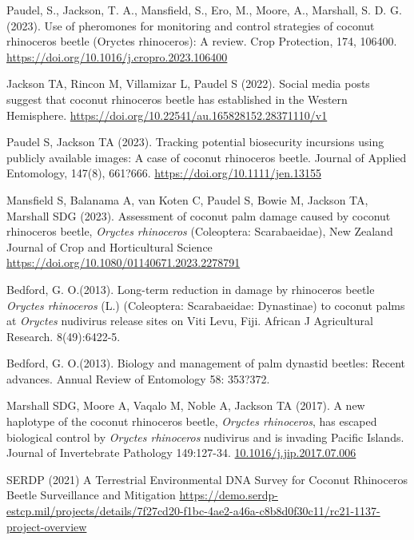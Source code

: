 \documentclass[11pt,english,letterpaper]{scrartcl}
\begin{document}
\begingroup
\renewcommand{\section}[2]{}%
\begin{thebibliography}{1}
	
 Paudel, S., Jackson, T. A., Mansfield, S., Ero, M., Moore, A., Marshall, S. D. G. (2023). Use of pheromones for monitoring and control strategies of coconut rhinoceros beetle (Oryctes rhinoceros): A review. Crop Protection, 174, 106400. \url{https://doi.org/10.1016/j.cropro.2023.106400}
	
 Jackson TA, Rincon M, Villamizar L, Paudel S (2022). Social media posts suggest that coconut rhinoceros beetle has established in the Western Hemisphere. \url{https://doi.org/10.22541/au.165828152.28371110/v1}
	
 Paudel S, Jackson TA (2023). Tracking potential biosecurity incursions using publicly available images: A case of coconut rhinoceros beetle. Journal of Applied Entomology, 147(8), 661?666. 
\url{https://doi.org/10.1111/jen.13155}
	
 Mansfield S, Balanama A, van Koten C, Paudel S, Bowie M, Jackson TA, Marshall SDG (2023). Assessment of coconut palm damage caused by coconut rhinoceros beetle, \textit{Oryctes rhinoceros} (Coleoptera: Scarabaeidae), New Zealand Journal of Crop and Horticultural Science \url{https://doi.org/10.1080/01140671.2023.2278791}
	
 Bedford, G. O.(2013). Long-term reduction in damage by rhinoceros beetle \textit{Oryctes rhinoceros} (L.) (Coleoptera: Scarabaeidae: Dynastinae) to coconut palms at \textit{Oryctes} nudivirus release sites on Viti Levu, Fiji. African J Agricultural Research. 8(49):6422-5. 

 Bedford, G. O.(2013). Biology and management of palm dynastid beetles: Recent advances. Annual Review of Entomology 58: 353?372. 

 Marshall SDG, Moore A, Vaqalo M, Noble A, Jackson TA (2017). A new haplotype of the coconut rhinoceros beetle, \textit{Oryctes rhinoceros}, has escaped biological control by \textit{Oryctes rhinoceros} nudivirus and is invading Pacific Islands. Journal of Invertebrate Pathology 149:127-34. 
\url{10.1016/j.jip.2017.07.006}

 SERDP (2021) A Terrestrial Environmental DNA Survey for Coconut Rhinoceros Beetle Surveillance and Mitigation
\url{https://demo.serdp-estcp.mil/projects/details/7f27cd20-f1bc-4ae2-a46a-c8b8d0f30c11/rc21-1137-project-overview}
	

\end{thebibliography}
\end{document}
